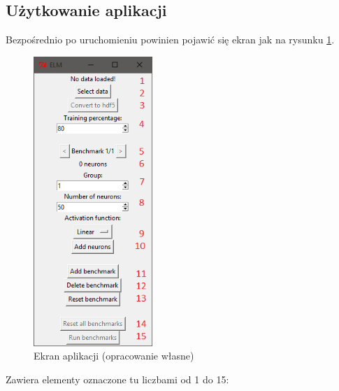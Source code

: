 \documentclass[pl]{minipw} %
\begin{document}
\subsection*{Użytkowanie aplikacji}
Bezpośrednio po uruchomieniu powinien pojawić się ekran jak na rysunku \ref{python_ekran}.
\begin{figure}[H]
\centering
\includegraphics[width=0.4\textwidth]{instrukcja_python_start.png}
\caption[Ekran aplikacji]{Ekran aplikacji (opracowanie własne)}
\label{python_ekran}
\end{figure}
Zawiera elementy oznaczone tu liczbami od 1 do 15:
\end{document}
